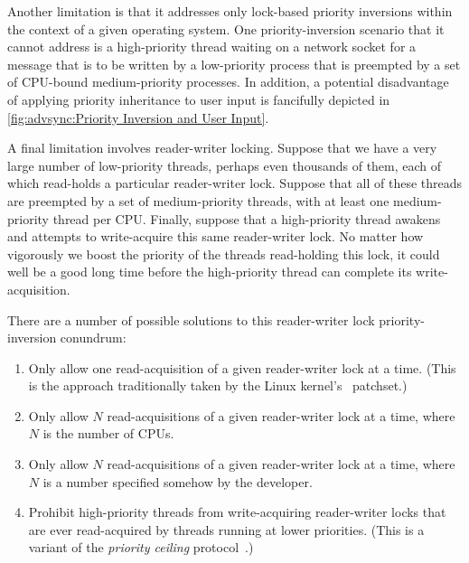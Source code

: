 Another limitation is that it addresses only lock-based priority
inversions within the context of a given operating system.
One priority-inversion scenario that it cannot address is a high-priority
thread waiting on a network socket for a message that is to be written
by a low-priority process that is preempted by a set of CPU-bound
medium-priority processes.
In addition, a potential disadvantage of applying priority inheritance
to user input is fancifully depicted in
\cref{fig:advsync:Priority Inversion and User Input}.

A final limitation involves reader-writer locking.
Suppose that we have a very large number of low-priority threads, perhaps
even thousands of them, each
of which read-holds a particular reader-writer lock.
Suppose that all of these threads are preempted by a set of medium-priority
threads, with at least one medium-priority thread per CPU\@.
Finally, suppose that a high-priority thread awakens and attempts to
write-acquire this same reader-writer lock.
No matter how vigorously we boost the priority of the threads read-holding
this lock, it could well be a good long time before the high-priority
thread can complete its write-acquisition.

There are a number of possible solutions to this reader-writer lock
priority-inversion conundrum:

\begin{enumerate}
\item	Only allow one read-acquisition of a given reader-writer lock
	at a time.  (This is the approach traditionally taken by
	the Linux kernel's \rt\ patchset.)
\item	Only allow $N$ read-acquisitions of a given reader-writer lock
	at a time, where $N$ is the number of CPUs.
\item	Only allow $N$ read-acquisitions of a given reader-writer lock
	at a time, where $N$ is a number specified somehow by the
	developer.
\item	Prohibit high-priority threads from write-acquiring reader-writer
	locks that are ever read-acquired by threads running at lower
	priorities.
	(This is a variant of the \emph{priority ceiling}
	protocol~\cite{LuiSha1990PriorityInheritance}.)
\end{enumerate}

